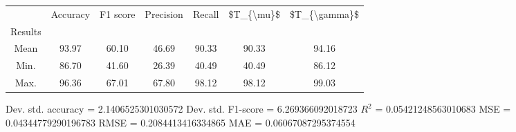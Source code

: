 \begin{tabular}{|c|c|c|c|c|c|c|}
\toprule
{} &  Accuracy &  F1 score &  Precision &  Recall &  \$T\_\{\textbackslash mu\}\$ &  \$T\_\{\textbackslash gamma\}\$ \\
Results &           &           &            &         &            &               \\
\hline
Mean    &     93.97 &     60.10 &      46.69 &   90.33 &      90.33 &         94.16 \\
Min.    &     86.70 &     41.60 &      26.39 &   40.49 &      40.49 &         86.12 \\
Max.    &     96.36 &     67.01 &      67.80 &   98.12 &      98.12 &         99.03 \\
\bottomrule
\end{tabular}

 Dev. std. accuracy = 2.1406525301030572
 Dev. std. F1-score = 6.269366092018723
 $R^2$ = 0.05421248563010683
 MSE = 0.04344779290196783
 RMSE = 0.2084413416334865
 MAE = 0.06067087295374554